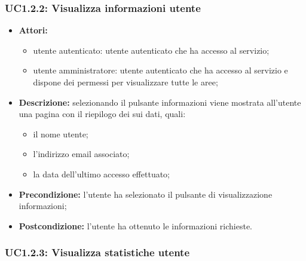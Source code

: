 \subsubsection{UC1.2.2: Visualizza informazioni utente}

\begin{itemize}
    \item \textbf{Attori:}
    \begin{itemize}
        \item utente autenticato: utente autenticato che ha accesso al servizio;
        \item utente amministratore: utente autenticato che ha accesso al servizio e dispone dei permessi per visualizzare tutte le aree;
    \end{itemize}
    \item \textbf{Descrizione:} selezionando il pulsante informazioni viene mostrata all'utente una pagina con il riepilogo dei sui dati, quali:
    \begin{itemize}
        \item il nome utente;
        \item l'indirizzo email associato;
        \item la data dell'ultimo accesso effettuato;
    \end{itemize}
    \item \textbf{Precondizione:} l'utente ha selezionato il pulsante di visualizzazione informazioni;
    \item \textbf{Postcondizione:} l'utente ha ottenuto le informazioni richieste.
\end{itemize}

\subsubsection{UC1.2.3: Visualizza statistiche utente}

